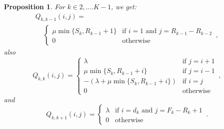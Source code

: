 \documentclass[conference]{IEEEtran}
\newtheorem{prosi}{Proposition}
\begin{document}
\begin{prosi}
For $k \in {2,....K-1}$, we get:
\begin{multline*}
Q_{k,k-1}(i,j)= \\
\quad \, 
\begin{cases}
\mu \min\{S_{k},R_{k-1}\!+\!1\}  & \text{if } i= \! 1 \text{ and } j \! = \! R_{k-1} \! - \! R_{k- \! 2}\\
0 & \text{otherwise}
\end{cases}\, ,
\end{multline*}
also
\begin{equation*}
Q_{k,k}(i,j) =
\begin{cases}
\lambda                                 & \text{if } j=i+1\\
\mu \min\{S_{k},R_{k-1}+i\}             & \mbox{if } j=i-1\\
-(\lambda+\mu \min\{S_{k},R_{k-1}+i\})  & \text{if } i=j\\
0                                       & \text{otherwise}
\end{cases}\, ,
\end{equation*}
and
\begin{equation*}
Q_{k,k+1}(i,j) =
\begin{cases}
\lambda             & \text{if } i=d_{k} \text{ and } j=F_{k}-R_{k}+1\\
0                   & \mbox{otherwise}
\end{cases}\, .
\end{equation*}


\end{prosi}
\end{document}
